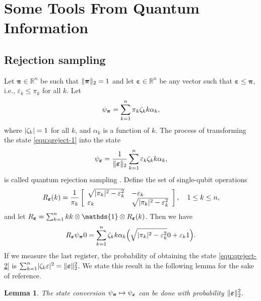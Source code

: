 \documentclass[11pt]{article}
\theoremstyle{plain}
\newtheorem{lemma}[theorem]{Lemma}
\theoremstyle{definition}
\DeclarePairedDelimiter{\abs}{\lvert}{\rvert}
\DeclarePairedDelimiter{\norm}{\lVert}{\rVert}
\let\ket\relax
\DeclarePairedDelimiter{\ket}{\lvert}{\rangle}
\let\bra\relax
\DeclarePairedDelimiter{\bra}{\langle}{\rvert}
\def\R{\mathbb{R}}
\begin{document}



\section{Some Tools From Quantum Information}


\subsection{Rejection sampling}

Let $\bm{\pi} \in \R^n$ be such that $\norm{\bm{\pi}}_2 = 1$ and let $\bm{\varepsilon} \in \R^n$ be any vector such that $\bm{\varepsilon} \le \bm{\pi}$, i.e., $\varepsilon_k \le \pi_k$ for all $k$. Let
\begin{equation}
    \label{equ:qreject-1}
    \ket{\psi_{\bm{\pi}}} = \sum_{k = 1}^n \pi_k\zeta_k \ket{k}\ket{\alpha_k},
\end{equation}
where $\abs{\zeta_k} = 1$ for all $k$, and $\alpha_k$ is a function of $k$. The process of transforming the state \eqref{equ:qreject-1} into the state
\begin{equation}
    \label{equ:qreject-2}
    \ket{\psi_{\bm{\varepsilon}}} = \frac{1}{\norm{\bm{\varepsilon}}_2} \sum_{k = 1}^n \varepsilon_k\zeta_k \ket{k}\ket{\alpha_k},
\end{equation}
is called quantum rejection sampling \cite{ozols2013quantum}. Define the set of single-qubit operations
\[ R_{\bm{\varepsilon}}(k) = \frac{1}{\pi_k}
\left[
\begin{array}{ll}
    \sqrt{\abs{\pi_k}^2 - \varepsilon_k^2} & -\varepsilon_k \\
    \varepsilon_k &\sqrt{\abs{\pi_k}^2 - \varepsilon_k^2}
\end{array}
\right]
, \quad 1 \le k \le n,
\]
and let $R_{\bm{\varepsilon}} = \sum_{k = 1}^n \ket{k}\bra{k} \otimes \mathds{1} \otimes R_{\bm{\varepsilon}}(k)$. Then we have
\[ R_{\bm{\varepsilon}} \ket{\psi_{\bm{\pi}}}\ket{0} = \sum_{k = 1}^n \zeta_k \ket{k}\ket{\alpha_k} \Big( \sqrt{\abs{\pi_k}^2 - \varepsilon_k^2}\ket{0} + \varepsilon_k\ket{1} \Big). \]
If we measure the last register, the probability of obtaining the state \eqref{equ:qreject-2} is $\sum_{k = 1}^n \abs{\zeta_k\varepsilon}^2 = \lVert \bm{\varepsilon} \rVert_2^2$. We state this result in the following lemma for the sake of reference.
\begin{lemma}
    \label{lem:qrs}
    The state conversion $\ket{\psi_{\bm{\pi}}} \mapsto \ket{\psi_{\bm{\varepsilon}}}$ can be done with probability $\norm{\displaystyle \bm{\varepsilon}}_2^2$.
\end{lemma}
\end{document}
